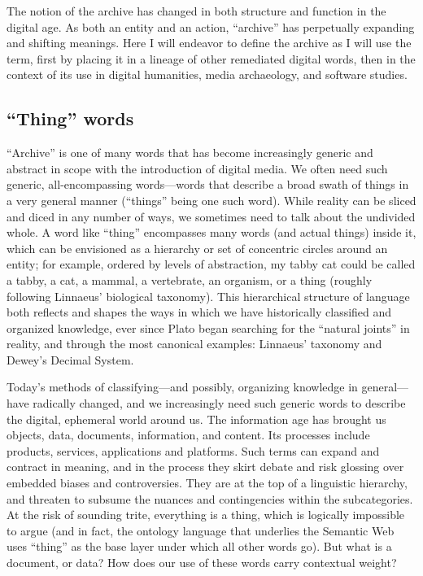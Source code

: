 The notion of the archive has changed in both structure and function in the digital age. As both an entity and an action, ``archive'' has perpetually expanding and shifting meanings. Here I will endeavor to define the archive as I will use the term, first by placing it in a lineage of other remediated digital words, then in the context of its use in digital humanities, media archaeology, and software studies.

\subsection{``Thing'' words}

``Archive'' is one of many words that has become increasingly generic and abstract in scope with the introduction of digital media. We often need such generic, all-encompassing words---words that describe a broad swath of things in a very general manner (``things'' being one such word). While reality can be sliced and diced in any number of ways, we sometimes need to talk about the undivided whole. A word like ``thing'' encompasses many words (and actual things) inside it, which can be envisioned as a hierarchy or set of concentric circles around an entity; for example, ordered by levels of abstraction, my tabby cat could be called a tabby, a cat, a mammal, a vertebrate, an organism, or a thing (roughly following Linnaeus' biological taxonomy). This hierarchical structure of language both reflects and shapes the ways in which we have historically classified and organized knowledge, ever since Plato began searching for the ``natural joints'' in reality, and through the most canonical examples: Linnaeus' taxonomy and Dewey's Decimal System.

Today's methods of classifying---and possibly, organizing knowledge in general---have radically changed, and we increasingly need such generic words to describe the digital, ephemeral world around us. The information age has brought us objects, data, documents, information, and content. Its processes include products, services, applications and platforms. Such terms can expand and contract in meaning, and in the process they skirt debate and risk glossing over embedded biases and controversies. They are at the top of a linguistic hierarchy, and threaten to subsume the nuances and contingencies within the subcategories. At the risk of sounding trite, everything is a thing, which is logically impossible to argue (and in fact, the ontology language that underlies the Semantic Web uses ``thing'' as the base layer under which all other words go). But what is a document, or data? How does our use of these words carry contextual weight?

